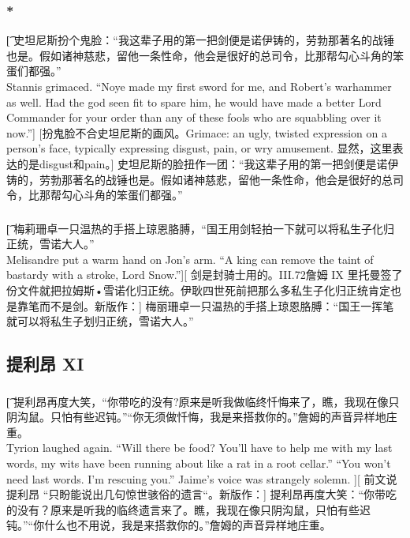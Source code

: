 \documentclass[12pt,a4paper]{article}
\begin{document}
\subsubsection{\color{red}*}\t[
	史坦尼斯扮个鬼脸：“我这辈子用的第一把剑便是诺伊铸的，劳勃那著名的战锤也是。假如诸神慈悲，留他一条性命，他会是很好的总司令，比那帮勾心斗角的笨蛋们都强。”\\
	Stannis grimaced. “Noye made my first sword for me, and Robert's warhammer as well. Had the god seen fit to spare him, he would have made a better Lord Commander for your order than any of these fools who are squabbling over it now.”]
	[扮鬼脸不合史坦尼斯的画风。Grimace: an ugly, twisted expression on a person's face, typically expressing disgust, pain, or wry amusement. 显然，这里表达的是disgust和pain。]	
	史坦尼斯的脸扭作一团：“我这辈子用的第一把剑便是诺伊铸的，劳勃那著名的战锤也是。假如诸神慈悲，留他一条性命，他会是很好的总司令，比那帮勾心斗角的笨蛋们都强。”
	
\subsubsection{}\t[
	梅莉珊卓一只温热的手搭上琼恩胳膊，“国王用剑轻拍一下就可以将私生子化归正统，雪诺大人。”\\
	Melisandre put a warm hand on Jon's arm. “A king can remove the taint of bastardy with a stroke, Lord Snow.”][
	剑是封骑士用的。III.72詹姆 IX 里托曼签了份文件就把拉姆斯•雪诺化归正统。伊耿四世死前把那么多私生子化归正统肯定也是靠笔而不是剑。新版作：]
	梅丽珊卓一只温热的手搭上琼恩胳膊：“国王一挥笔就可以将私生子划归正统，雪诺大人。”
	

\subsection{提利昂 XI}
\subsubsection{}\t[
	提利昂再度大笑，“你带吃的没有?原来是听我做临终忏悔来了，瞧，我现在像只阴沟鼠。只怕有些迟钝。”“你无须做忏悔，我是来搭救你的。”詹姆的声音异样地庄重。\\
	Tyrion laughed again. “Will there be food? You'll have to help me with my last words, my wits have been running about like a rat in a root cellar.” “You won't need last words. I'm rescuing you.” Jaime's voice was strangely solemn. ][
	前文说提利昂 “只盼能说出几句惊世骇俗的遗言“。新版作：]
	提利昂再度大笑：“你带吃的没有？原来是听我的临终遗言来了。瞧，我现在像只阴沟鼠，只怕有些迟钝。”“你什么也不用说，我是来搭救你的。”詹姆的声音异样地庄重。
	
\end{document}
